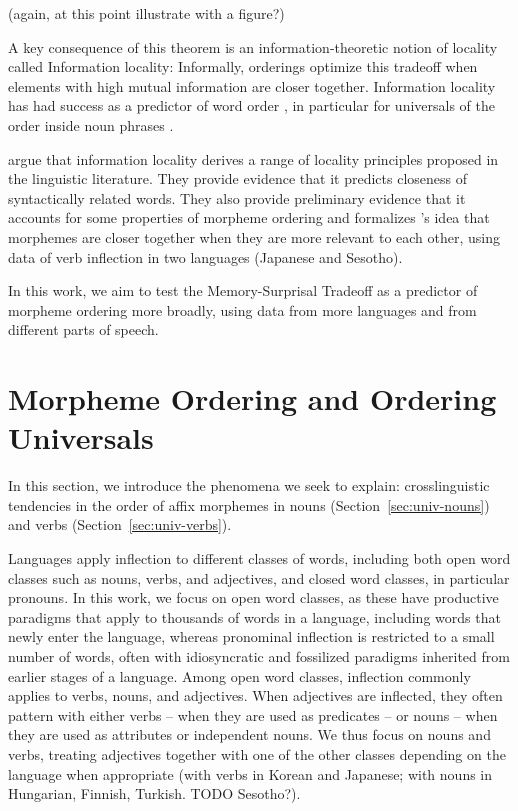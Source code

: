 \documentclass[11pt,letterpaper]{article}
\newcommand{\citep}{\parencite}
\newcommand{\citet}{\Textcite}
\newcommand\mhahn[1]{{\color{red}(#1)}}
\newcommand{\jd}[1]{\textcolor{Pink}{[jd: #1]}}
\newcounter{theorem}
\begin{document}
\mhahn{again, at this point illustrate with a figure?}

A key consequence of this theorem is an information-theoretic notion of locality called Information locality:
Informally, orderings optimize this tradeoff when elements with high mutual information are closer together.
Information locality has had success as a predictor of word order \citep{futrell2019information}, in particular for universals of the order inside noun phrases \citep{culbertson2020from,hahn-information-theoretic-2018,DBLP:conf/acl/FutrellDS20}.



\citet{Hahn2020modeling} argue that information locality derives a range of locality principles proposed in the linguistic literature.
They provide evidence that it predicts closeness of syntactically related words.
They also provide preliminary evidence that it accounts for some properties of morpheme ordering and formalizes \cite{bybee-morphology-1985}'s idea that morphemes are closer together when they are more relevant to each other, using data of verb inflection in two languages (Japanese and Sesotho).

In this work, we aim to test the Memory-Surprisal Tradeoff as a predictor of morpheme ordering more broadly, using data from more languages and from different parts of speech.



\section{Morpheme Ordering and Ordering Universals}


In this section, we introduce the phenomena we seek to explain: crosslinguistic tendencies in the order of affix morphemes in nouns (Section~\ref{sec:univ-nouns}) and verbs (Section~\ref{sec:univ-verbs}).

Languages apply inflection to different classes of words, including both open word classes such as nouns, verbs, and adjectives, and closed word classes, in particular pronouns.
In this work, we focus on open word classes, as these have productive paradigms that apply to thousands of words in a language, including words that newly enter the language, whereas pronominal inflection is restricted to a small number of words, often with idiosyncratic and fossilized paradigms inherited from earlier stages of a language.
Among open word classes, inflection commonly applies to verbs, nouns, and adjectives.
When adjectives are inflected, they often pattern with either verbs -- when they are used as predicates -- or nouns -- when they are used as attributes or independent nouns.
We thus focus on nouns and verbs, treating adjectives together with one of the other classes depending on the language when appropriate (with verbs in Korean and Japanese; with nouns in Hungarian, Finnish, Turkish. TODO Sesotho?).
\end{document}
